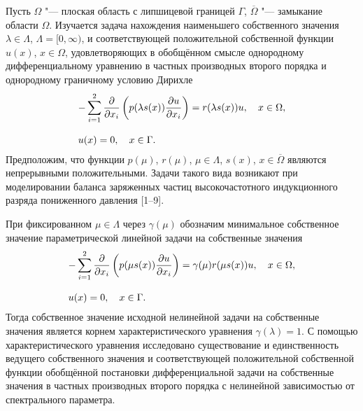 
\vzmscaption

Пусть
$\Omega$ "--- плоская область с липшицевой границей $\Gamma$,
$\overline{\Omega}$ "--- замыкание области $\Omega$.
Изучается задача нахождения наименьшего собственного
значения ${\lambda\in\Lambda}$, ${\Lambda=[0,\infty)}$, и соответствующей
положительной собственной функции $u(x)$, ${x\in\Omega}$,
удовлетворяющих в обобщённом смысле однородному
дифференциальному уравнению
в частных производных
второго порядка и
однородному граничному условию Дирихле
\begin{equation*}
\begin{array}{l}
\displaystyle
-\sum_{i=1}^{2}\frac{\partial}{\partial x_i}\left(p(\lambda s(x))\frac{\partial u}{\partial x_i}\right)=
r(\lambda s(x))u,\quad
x\in\Omega,
\bigskip
\\
\displaystyle
u(x)=0,\quad
x\in\Gamma.
\end{array}
\label{sol_f1}
\end{equation*}
Предположим, что функции
$p(\mu)$,
$r(\mu)$, $\mu\in\Lambda$,
$s(x)$, $x\in\overline{\Omega}$
являются непрерывными положительными.
Задачи такого вида возникают при моделировании баланса заряженных частиц
высокочастотного индукционного разряда
пониженного давления
[1--9].

При фиксированном $\mu\in\Lambda$
через $\gamma(\mu)$ обозначим
минимальное собственное значение
параметрической линейной задачи на собственные значения
\begin{equation*}
\begin{array}{l}
\displaystyle
-\sum_{i=1}^{2}\frac{\partial}{\partial x_i}
\left(p(\mu s(x))\frac{\partial u}{\partial x_i}\right)=
\gamma(\mu)
r(\mu s(x))u,\quad
x\in\Omega,
\bigskip
\\
\displaystyle
u(x)=0,\quad
x\in\Gamma.
\end{array}
\label{sol_f1}
\end{equation*}
Тогда собственное значение исходной нелинейной задачи на собственные значения
является корнем характеристического уравнения
$\gamma(\lambda)=1.$
С помощью характеристического уравнения исследовано существование
и единственность
ведущего собственного значения и
соответствующей положительной собственной функции
обобщённой постановки
дифференциальной задачи на собственные значения
в частных производных
второго порядка
с нелинейной зависимостью от спектрального параметра.

